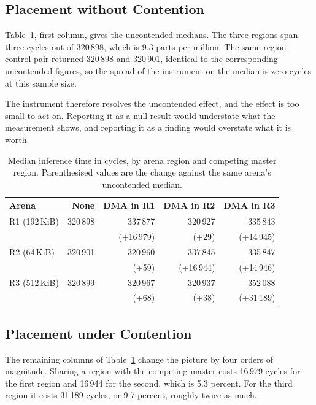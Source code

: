 \documentclass[conference]{IEEEtran}
\begin{document}
\subsection{Placement without Contention}

Table~\ref{tab:matrix}, first column, gives the uncontended medians. The
three regions span three cycles out of 320\,898, which is 9.3 parts per
million. The same-region control pair returned 320\,898 and 320\,901,
identical to the corresponding uncontended figures, so the spread of the
instrument on the median is zero cycles at this sample size.

The instrument therefore resolves the uncontended effect, and the effect
is too small to act on. Reporting it as a null result would understate
what the measurement shows, and reporting it as a finding would overstate
what it is worth.

\begin{table}[t]
\caption{Median inference time in cycles, by arena region and competing
master region. Parenthesised values are the change against the same
arena's uncontended median.}
\label{tab:matrix}
\centering
\begin{tabular}{lrrrr}
\toprule
Arena & None & DMA in R1 & DMA in R2 & DMA in R3 \\
\midrule
R1 (192\,KiB) & 320\,898 & 337\,877 & 320\,927 & 335\,843 \\
              &          & (+16\,979) & (+29) & (+14\,945) \\
R2 (64\,KiB)  & 320\,901 & 320\,960 & 337\,845 & 335\,847 \\
              &          & (+59) & (+16\,944) & (+14\,946) \\
R3 (512\,KiB) & 320\,899 & 320\,967 & 320\,937 & 352\,088 \\
              &          & (+68) & (+38) & (+31\,189) \\
\bottomrule
\end{tabular}
\end{table}

\subsection{Placement under Contention}

The remaining columns of Table~\ref{tab:matrix} change the picture by
four orders of magnitude. Sharing a region with the competing master
costs 16\,979 cycles for the first region and 16\,944 for the second,
which is 5.3 percent. For the third region it costs 31\,189 cycles, or
9.7 percent, roughly twice as much.
\end{document}

